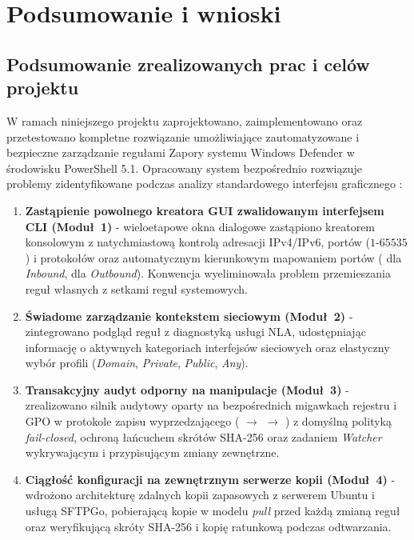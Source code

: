 \chapter{Podsumowanie i wnioski}\label{ch:podsumowanie}

\section{Podsumowanie zrealizowanych prac i celów projektu}\label{sec:podsumowanie-prac}

W ramach niniejszego projektu zaprojektowano, zaimplementowano oraz przetestowano kompletne rozwiązanie umożliwiające zautomatyzowane i bezpieczne zarządzanie regułami Zapory systemu Windows Defender w środowisku PowerShell 5.1. Opracowany system bezpośrednio rozwiązuje problemy zidentyfikowane podczas analizy standardowego interfejsu graficznego :

\begin{enumerate}
    \item \textbf{Zastąpienie powolnego kreatora GUI zwalidowanym interfejsem CLI (Moduł~1)} - wieloetapowe okna dialogowe zastąpiono kreatorem konsolowym z natychmiastową kontrolą adresacji IPv4/IPv6, portów ($1\text{-}65535$) i protokołów oraz automatycznym kierunkowym mapowaniem portów ( dla \textit{Inbound},  dla \textit{Outbound}). Konwencja  wyeliminowała problem przemieszania reguł własnych z setkami reguł systemowych.
    \item \textbf{Świadome zarządzanie kontekstem sieciowym (Moduł~2)} - zintegrowano podgląd reguł z diagnostyką usługi NLA, udostępniając informację o aktywnych kategoriach interfejsów sieciowych oraz elastyczny wybór profili (\textit{Domain}, \textit{Private}, \textit{Public}, \textit{Any}).
    \item \textbf{Transakcyjny audyt odporny na manipulacje (Moduł~3)} - zrealizowano silnik audytowy oparty na bezpośrednich migawkach rejestru i GPO w protokole zapisu wyprzedzającego ( $\rightarrow$  $\rightarrow$ ) z domyślną polityką \textit{fail-closed}, ochroną łańcuchem skrótów SHA-256 oraz zadaniem \textit{Watcher} wykrywającym i przypisującym zmiany zewnętrzne.
    \item \textbf{Ciągłość konfiguracji na zewnętrznym serwerze kopii (Moduł~4)} - wdrożono architekturę zdalnych kopii zapasowych z serwerem Ubuntu i usługą SFTPGo, pobierającą kopie  w modelu \textit{pull} przed każdą zmianą reguł oraz weryfikującą skróty SHA-256 i kopię ratunkową  podczas odtwarzania.
\end{enumerate}

